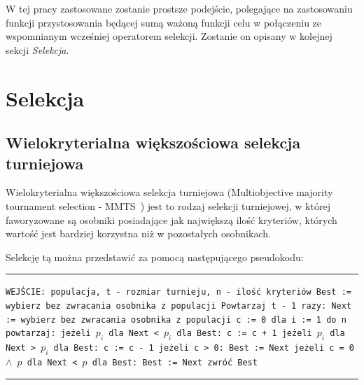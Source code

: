 \documentclass{xmgr}
\begin{document}
W tej pracy zastosowane zostanie prostsze podejście, polegające na zastosowaniu funkcji przystosowania będącej sumą ważoną funkcji celu w połączeniu ze wspomnianym wcześniej operatorem selekcji. Zostanie on opisany w kolejnej sekcji \emph{Selekcja}.


\section{Selekcja}

\subsection{Wielokryterialna większościowa selekcja turniejowa}

Wielokryterialna większościowa selekcja turniejowa (Multiobjective majority tournament selection - MMTS~\cite{Luke2009Metaheuristics}) jest to rodzaj selekcji turniejowej, w której faworyzowane są osobniki posiadające jak największą ilość kryteriów, których wartość jest bardziej korzystna niż w pozostałych osobnikach.

Selekcję tą można przedstawić za pomocą następującego pseudokodu:

\noindent
\rule{380pt}{0.5pt}\newline
\texttt{WEJŚCIE: populacja, t - rozmiar turnieju, n - ilość kryteriów\newline
Best := wybierz bez zwracania osobnika z populacji\newline
Powtarzaj t - 1 razy:\newline
\indent Next := wybierz bez zwracania osobnika z populacji\newline
\indent c := 0\newline
\indent dla i := 1 do n powtarzaj:\newline
\indent\indent jeżeli $p_i$ dla Next < $p_i$ dla Best:\newline
\indent\indent\indent c := c + 1\newline
\indent\indent jeżeli $p_i$ dla Next > $p_i$ dla Best:\newline
\indent\indent\indent c := c - 1\newline
\indent jeżeli c > 0:\newline
\indent\indent Best := Next\newline
\indent jeżeli c = 0 $\wedge$ $p$ dla Next < $p$ dla Best:\newline
\indent\indent Best := Next\newline
zwróć Best\newline
}
\rule{380pt}{0.5pt}\newline
\end{document}
